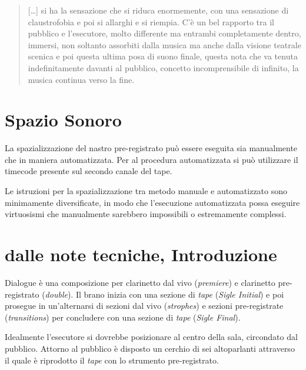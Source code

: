 


\begin{quote}
{\small
[\ldots] si ha la sensazione che si riduca enormemente, con una sensazione di claustrofobia e poi si allarghi e si riempia. C'è un bel rapporto tra il pubblico e l'esecutore, molto differente ma entrambi completamente dentro, immersi, non soltanto assorbiti dalla musica ma anche dalla visione teatrale scenica e poi questa ultima posa di suono finale, questa nota che va tenuta indefinitamente davanti al pubblico, concetto incomprensibile di infinito, la musica continua verso la fine.
}
\end{quote}

\section*{Spazio Sonoro}

La spazializzazione del nastro pre-registrato può essere eseguita sia manualmente che in maniera automatizzata. Per al procedura automatizzata si può utilizzare il timecode presente sul secondo canale del tape.

Le istruzioni per la spazializzazione tra metodo manuale e automatizzato sono minimamente diversificate, in modo che l'esecuzione automatizzata possa eseguire virtuosismi che manualmente sarebbero impossibili o estremamente complessi.


\section{dalle note tecniche, Introduzione}

Dialogue è una composizione per clarinetto dal vivo (\emph{premiere}) e clarinetto pre-registrato (\emph{double}). Il brano inizia con una sezione di \emph{tape} (\emph{Sigle Initial}) e poi prosegue in un'alternarsi di sezioni dal vivo (\emph{strophes}) e sezioni pre-registrate (\emph{transitions}) per concludere con una sezione di \emph{tape} (\emph{Sigle Final}).

Idealmente l'esecutore si dovrebbe posizionare al centro della sala, circondato dal pubblico. Attorno al pubblico è disposto un cerchio di sei altoparlanti attraverso il quale è riprodotto il \emph{tape} con lo strumento pre-registrato.

